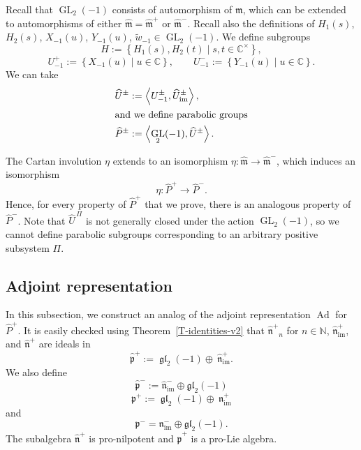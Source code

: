 \documentclass[11pt,letterpaper]{amsart}
\newcounter{thecounter}
\numberwithin{thecounter}{section}
\newtheorem{proposition}[thecounter]{Proposition}
\theoremstyle{definition}
\DeclareMathOperator{\GL}{GL}
\DeclareMathOperator{\gl}{\mathfrak{gl}}
\DeclareMathOperator{\Ad}{Ad}
\DeclareMathOperator{\im}{{im}}
\newcommand{\C}{{\mathbb C}}
\newcommand{\N}{{\mathbb N}}
\newcommand{\Up}{U^+}
\newcommand{\Um}{U^-}
\newcommand{\Upm}{U^\pm}
\newcommand{\Uhp}{{\widehat{U}^+}}
\newcommand{\UhPi}{{\widehat{U}^{\,\Pi}}}
\newcommand{\Bhp}{{\widehat{B}^+}}
\newcommand{\Bhpm}{{\widehat{B}^\pm}}
\newcommand{\Php}{{\widehat{P}^+}}
\newcommand{\Phm}{{\widehat{P}^-}}
\newcommand{\Phpm}{{\widehat{P}^\pm}}
\newcommand{\Uhpm}{{\widehat{U}^\pm}}
\newcommand{\Uhimp}{{\widehat{U}_{\im}^+}}
\newcommand{\Uhimpm}{{\widehat{U}_{\im}^\pm}}
\newcommand{\mhat}{{\widehat{\mathfrak{m}}}}
\newcommand{\nhp}{{\widehat{\mathfrak{n}}^+}}
\newcommand{\nimp}{{\mathfrak{n}_{\im}^+}}
\newcommand{\nhimp}{{\widehat{\mathfrak{n}}_{\im}^+}}
\begin{document}
Recall that $\GL_2(-1)$ consists of automorphism of $\mathfrak{m}$, which can be extended to automorphisms of either $\mhat=\mhat^+$ or $\mhat^-$. Recall also the definitions of $H_1(s)$, $H_2(s)$, $X_{-1}(u)$, $Y_{-1}(u)$, $\widetilde{w}_{-1}\in\GL_2(-1)$.
We define subgroups
$$ H:= \left\{H_1(s),H_2(t) \mid s,t\in\C^\times\right\},$$
$$  \Up_{-1} := \left\{X_{-1}(u)\mid u\in\C\right\},\qquad
\Um_{-1} := \left\{Y_{-1}(u)\mid u\in\C\right\}.$$
We can take
\begin{align*}
 \Uhpm &:= \left\langle \Upm_{-1}, \Uhimpm\right\rangle,\\
\intertext{and we define parabolic groups}
 \Phpm &:= \left\langle \GL_2(-1), \Uhpm\right\rangle.
\end{align*}

The Cartan involution $\eta$ extends to an isomorphism $\eta: \mhat\to \mhat^-$, which induces an isomorphism
$$\eta: \Php \to \Phm.$$
Hence, for every property of $\Php$ that we prove, there is an analogous property of $\Phm$.
Note that $\UhPi$ is not generally closed under the action $\GL_2(-1)$, so we cannot define parabolic subgroups corresponding to an arbitrary positive subsystem $\Pi$.







\subsection{Adjoint representation}\label{SS-adjoint}


In this subsection, we construct an analog of the adjoint representation $\Ad$ for $\Php$.
It is easily checked using Theorem~\ref{T-identities-v2} that $\nhp_n$ for $n\in\N$, $\nhimp$, and $\nhp$ are ideals
in $$\widehat{\mathfrak{p}}^+ := \gl_2(-1)\oplus\ \nhimp.$$
We also define
$$\widehat{\mathfrak p}^{-}
:=
\widehat{\mathfrak n}^{-}_{\mathrm{im}}
\oplus
\mathfrak{gl}_2(-1)$$
$${\mathfrak{p}}^+ := \gl_2(-1)\oplus\ \nimp$$
and
$${\mathfrak p}^{-}
=
{\mathfrak n}^{-}_{\mathrm{im}}
\oplus
\mathfrak{gl}_2(-1).$$
The subalgebra $\nhp$ is pro-nilpotent and $\widehat{\mathfrak{p}}^+$ is a pro-Lie algebra.
\end{document}

